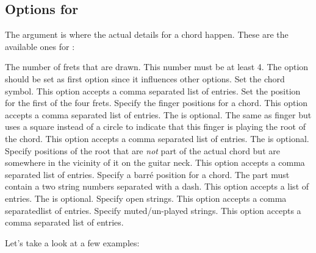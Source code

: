 \documentclass[load-preamble+]{cnltx-doc}
\begin{document}
\subsection{Options for }
The  argument is where the actual details for a chord
happen. These are the available ones for :
\begin{options}
    The number of frets that are drawn.  This number must be
    at least 4.  The option should be set as first option since it influences
    other options.
    Set the chord symbol. This option accepts a comma separated list of
    entries.
    Set the position for the first of the four frets.
    Specify the finger positions for a chord.  This option accepts a comma
    separated list of entries.  The  is optional.
    The same as finger but uses a square instead of a circle to indicate that
    this finger is playing the root of the chord.  This option accepts a comma
    separated list of  entries. The  is optional.
    Specify positions of the root that are \emph{not} part of the actual chord
    but are somewhere in the vicinity of it on the guitar neck.  This option
    accepts a comma separated list of entries.
    Specify a barr\'e position for a chord.  The  part must
    contain a two string numbers separated with a dash.  This option accepts a
    list of entries. The  is optional.
    Specify open strings.  This option accepts a comma separatedlist of
    entries.
    Specify muted/un-played strings.  This option accepts a comma separated
    list of entries.
\end{options}

Let's take a look at a few examples:

\begin{example}
  \chordscheme[
    name      = G ,
    position  = I ,
    finger    = {2/5:1} ,
    root      = {3/6:2, 3/1:4} ,
    ring      = {2,3,4}
  ]
\end{example}
\makeatletter
{}
\makeatother
\end{document}
